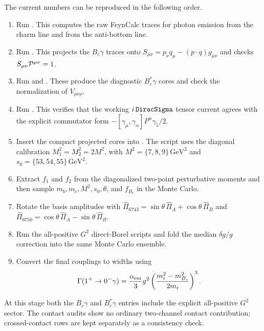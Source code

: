 \documentclass[11pt]{article}
\newcommand{\Bc}{B_c}
\newcommand{\GeV}{\mathrm{GeV}}
\begin{document}
The current numbers can be reproduced in the following order.
\begin{enumerate}
  \item Run .  This
  computes the raw FeynCalc traces for photon emission from the charm line and
  from the anti-bottom line.
  \item Run .  This
  projects the \(B_c\gamma\) traces onto
  \(S_{\mu\nu}=p_\nu q_\mu-(p\cdot q)g_{\mu\nu}\) and checks
  \(S_{\mu\nu}{\cal P}^{\mu\nu}=1\).
  \item Run  and
  .  These produce the
  diagnostic \(B_c^\ast\gamma\) cores and check the normalization of
  \(V_{\mu\nu\rho}\).
  \item Run .
  This verifies that the working \(i\,{\tt DiracSigma}\) tensor current agrees
  with the explicit commutator form
  \(-[\gamma_\mu,\gamma_\alpha]P^\alpha\gamma_5/2\).
  \item Insert the compact projected cores into
  .  The script uses the
  diagonal calibration \(M_1^2=M_2^2=2M^2\), with
  \(M^2=\{7,8,9\}\,\GeV^2\) and \(s_0=\{53,54,55\}\,\GeV^2\).
  \item Extract \(f_1\) and \(f_2\) from the diagonalized two-point
  perturbative moments and then sample \(m_b,m_c,M^2,s_0,\theta\), and
  \(f_{B_c}\) in the Monte Carlo.
  \item Rotate the basis amplitudes with
  \(\widehat\Pi_{6743}=\sin\theta\,\widehat\Pi_A+\cos\theta\,\widehat\Pi_B\)
  and
  \(\widehat\Pi_{6750}=\cos\theta\,\widehat\Pi_A-\sin\theta\,\widehat\Pi_B\).
  \item Run the all-positive \(G^2\) direct-Borel scripts and fold the median
  \(\delta g/g\) correction into the same Monte Carlo ensemble.
  \item Convert the final couplings to widths using
  \[
  \Gamma(1^+\to0^-\gamma)=
  \frac{\alpha_{\rm em}}{3}g^2
  \left(\frac{m_i^2-m_{\Bc}^2}{2m_i}\right)^3 .
  \]
\end{enumerate}
At this stage both the \(B_c\gamma\) and \(B_c^\ast\gamma\) entries include the
explicit all-positive \(G^2\) sector.  The contact audits show no ordinary
two-channel contact contribution; crossed-contact rows are kept separately as a
consistency check.
\end{document}
